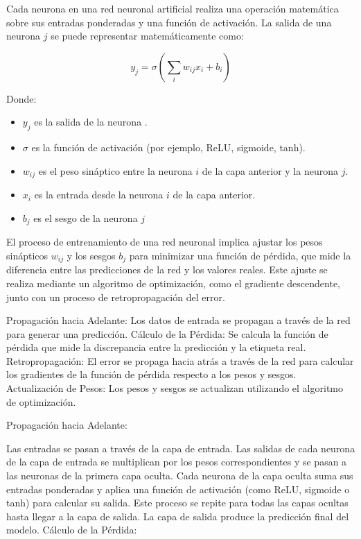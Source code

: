 \documentclass[conference]{IEEEtran}
\begin{document}
Cada neurona en una red neuronal artificial realiza una operación matemática sobre sus entradas ponderadas y una función de activación. La salida de una neurona $j$ se puede representar matemáticamente como:

\begin{equation}
	y_{j} = \sigma \left( \sum_{i} w_{ij}x_{i} + b_{i} \right)
	\label{eq:1}
\end{equation}

Donde:

\begin{itemize}
	\item $y_{j}$ es la salida de la neurona .
	\item $\sigma$ es la función de activación (por ejemplo, ReLU, sigmoide, tanh).
	\item $w_{ij}$ es el peso sináptico entre la neurona $i$ de la capa anterior y la neurona $j$.
	\item $x_{i}$ es la entrada desde la neurona $i$ de la capa anterior.
	\item $b_{j}$ es el sesgo de la neurona $j$
\end{itemize}

El proceso de entrenamiento de una red neuronal implica ajustar los pesos sinápticos $w_{ij}$ y los sesgos $b_{j}$ para minimizar una función de pérdida, que mide la diferencia entre las predicciones de la red y los valores reales. Este ajuste se realiza mediante un algoritmo de optimización, como el gradiente descendente, junto con un proceso de retropropagación del error.

Propagación hacia Adelante: Los datos de entrada se propagan a través de la red para generar una predicción.
Cálculo de la Pérdida: Se calcula la función de pérdida que mide la discrepancia entre la predicción y la etiqueta real.
Retropropagación: El error se propaga hacia atrás a través de la red para calcular los gradientes de la función de pérdida respecto a los pesos y sesgos.
Actualización de Pesos: Los pesos y sesgos se actualizan utilizando el algoritmo de optimización.

Propagación hacia Adelante:

Las entradas se pasan a través de la capa de entrada.
Las salidas de cada neurona de la capa de entrada se multiplican por los pesos correspondientes y se pasan a las neuronas de la primera capa oculta.
Cada neurona de la capa oculta suma sus entradas ponderadas y aplica una función de activación (como ReLU, sigmoide o tanh) para calcular su salida.
Este proceso se repite para todas las capas ocultas hasta llegar a la capa de salida.
La capa de salida produce la predicción final del modelo.
Cálculo de la Pérdida:
\end{document}

